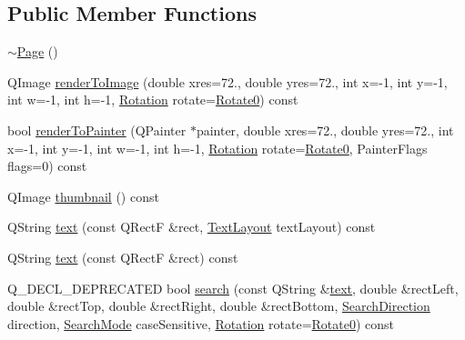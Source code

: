 \subsection*{Public Member Functions}
\begin{DoxyCompactItemize}
\item 
\hyperlink{class_poppler_1_1_page_a2341fff1cc032ab6528874175e7dd841}{$\sim$\+Page} ()
\item 
Q\+Image \hyperlink{class_poppler_1_1_page_a204d8018439dabf54b3b6f80be843dc3}{render\+To\+Image} (double xres=72., double yres=72., int x=-\/1, int y=-\/1, int w=-\/1, int h=-\/1, \hyperlink{class_poppler_1_1_page_a9c9a4e1bc301cd2ab4eac0b51f0dc0ec}{Rotation} rotate=\hyperlink{class_poppler_1_1_page_a9c9a4e1bc301cd2ab4eac0b51f0dc0eca6bd60f29c8d73b686ceb2030964823db}{Rotate0}) const
\item 
bool \hyperlink{class_poppler_1_1_page_a006c33318200e2aad87022b43de6ad1f}{render\+To\+Painter} (Q\+Painter $\ast$painter, double xres=72., double yres=72., int x=-\/1, int y=-\/1, int w=-\/1, int h=-\/1, \hyperlink{class_poppler_1_1_page_a9c9a4e1bc301cd2ab4eac0b51f0dc0ec}{Rotation} rotate=\hyperlink{class_poppler_1_1_page_a9c9a4e1bc301cd2ab4eac0b51f0dc0eca6bd60f29c8d73b686ceb2030964823db}{Rotate0}, Painter\+Flags flags=0) const
\item 
Q\+Image \hyperlink{class_poppler_1_1_page_a151c6caf7c0699f776108d2800b33ece}{thumbnail} () const
\item 
Q\+String \hyperlink{class_poppler_1_1_page_afbf36f00fbfd391b131ed3cb8fb9b848}{text} (const Q\+RectF \&rect, \hyperlink{class_poppler_1_1_page_ac2fe47d36367d63d78f493bec5ea0450}{Text\+Layout} text\+Layout) const
\item 
Q\+String \hyperlink{class_poppler_1_1_page_ad13d243914477ea1da81df435b64a87d}{text} (const Q\+RectF \&rect) const
\item 
Q\+\_\+\+D\+E\+C\+L\+\_\+\+D\+E\+P\+R\+E\+C\+A\+T\+ED bool \hyperlink{class_poppler_1_1_page_afc757aa670b4e16e7fd64c5b998c5e9f}{search} (const Q\+String \&\hyperlink{class_poppler_1_1_page_afbf36f00fbfd391b131ed3cb8fb9b848}{text}, double \&rect\+Left, double \&rect\+Top, double \&rect\+Right, double \&rect\+Bottom, \hyperlink{class_poppler_1_1_page_a693343ece22aa954a6357e97625e7c93}{Search\+Direction} direction, \hyperlink{class_poppler_1_1_page_ab14d06b2fea7e363fc10877e7f0c759a}{Search\+Mode} case\+Sensitive, \hyperlink{class_poppler_1_1_page_a9c9a4e1bc301cd2ab4eac0b51f0dc0ec}{Rotation} rotate=\hyperlink{class_poppler_1_1_page_a9c9a4e1bc301cd2ab4eac0b51f0dc0eca6bd60f29c8d73b686ceb2030964823db}{Rotate0}) const

\end{DoxyCompactItemize}
